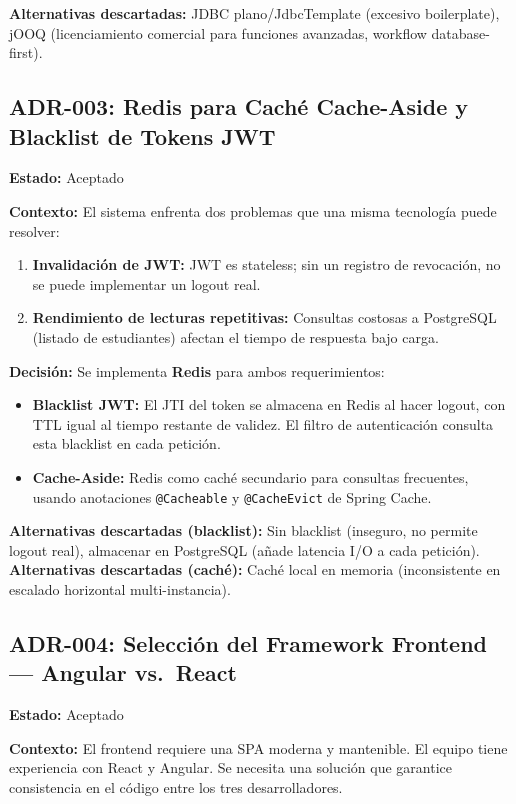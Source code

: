\documentclass[12pt]{article}
\begin{document}
	\textbf{Alternativas descartadas:} JDBC plano/JdbcTemplate (excesivo boilerplate), jOOQ (licenciamiento comercial para funciones avanzadas, workflow database-first).
	
	\subsection{ADR-003: Redis para Caché Cache-Aside y Blacklist de Tokens JWT}
	\textbf{Estado:} \textcolor{codegreen}{Aceptado}
	
	\textbf{Contexto:} El sistema enfrenta dos problemas que una misma tecnología puede resolver:
	\begin{enumerate}
		\item \textbf{Invalidación de JWT:} JWT es stateless; sin un registro de revocación, no se puede implementar un logout real.
		\item \textbf{Rendimiento de lecturas repetitivas:} Consultas costosas a PostgreSQL (listado de estudiantes) afectan el tiempo de respuesta bajo carga.
	\end{enumerate}
	
	\textbf{Decisión:} Se implementa \textbf{Redis} para ambos requerimientos:
	\begin{itemize}
		\item \textbf{Blacklist JWT:} El JTI del token se almacena en Redis al hacer logout, con TTL igual al tiempo restante de validez. El filtro de autenticación consulta esta blacklist en cada petición.
		\item \textbf{Cache-Aside:} Redis como caché secundario para consultas frecuentes, usando anotaciones \texttt{@Cacheable} y \texttt{@CacheEvict} de Spring Cache.
	\end{itemize}
	
	\textbf{Alternativas descartadas (blacklist):} Sin blacklist (inseguro, no permite logout real), almacenar en PostgreSQL (añade latencia I/O a cada petición). \textbf{Alternativas descartadas (caché):} Caché local en memoria (inconsistente en escalado horizontal multi-instancia).
	
	\subsection{ADR-004: Selección del Framework Frontend — Angular vs.\ React}
	\textbf{Estado:} \textcolor{codegreen}{Aceptado}
	
	\textbf{Contexto:} El frontend requiere una SPA moderna y mantenible. El equipo tiene experiencia con React y Angular. Se necesita una solución que garantice consistencia en el código entre los tres desarrolladores.
	
\end{document}
